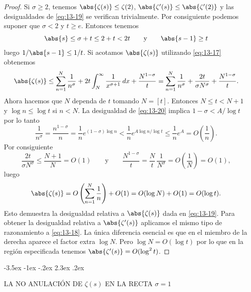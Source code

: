 \documentclass[12pt,a4paper]{book}
\makeatletter
\renewcommand\section{\@startsection{section}{1}{\z@}%
  {-3.5ex \@plus -1ex \@minus -.2ex}%
  {2.3ex \@plus .2ex}%
  {\normalfont\Large\bfseries\raggedright}}
\makeatother
\begin{document}
    \begin{proof}
        Si $\sigma\geq2$, tenemos $\abs{\zeta(s)}\leq\zeta(2)$, $\abs{\zeta'(s)}\leq\abs{\zeta'(2)}$
        y las desigualdades de \eqref{eq:13-19} se verifican trivialmente. Por consiguiente
        podemos suponer que $\sigma<2$ y $t\geq e$. Entonces tenemos
        \begin{equation*}
            \abs{s}\leq\sigma+t\leq2+t<2t\qquad\text{y}\qquad\abs{s-1}\geq t
        \end{equation*}
        luego $1/\abs{s-1}\leq1/t$. Si acotamos $\abs{\zeta(s)}$ utilizando \eqref{eq:13-17}
        obtenemos
        \begin{equation*}
            \abs{\zeta(s)}\leq\sum_{n=1}^{N}\frac{1}{n^{\sigma}}+2t\int_{N}^{\infty}\frac{1}{x^{\sigma+1}}\,dx+\frac{N^{1-\sigma}}{t}=\sum_{n=1}^{N}\frac{1}{n^{\sigma}}+\frac{2t}{\sigma N^{\sigma}}+\frac{N^{1-\sigma}}{t}.
        \end{equation*}
        Ahora hacemos que $N$ dependa de $t$ tomando $N=[t]$. Entonces $N\leq t<N+1$ y
        $\log n\leq\log t$ si $n<N$. La desigualdad de \eqref{eq:13-20} implica
        $1-\sigma<A/\log t$ por lo tanto
        \begin{equation*}
            \frac{1}{n^{\sigma}}=\frac{n^{1-\sigma}}{n}=\frac{1}{n}e^{(1-\sigma)\log n}<\frac{1}{n}e^{A\log n/\log t}\leq\frac{1}{n}e^{A}=O\left(\frac{1}{n}\right).
        \end{equation*}
        Por consiguiente
        \begin{equation*}
            \frac{2t}{\sigma N^{\sigma}}\leq\frac{N+1}{N}=O(1)\qquad\text{y}\qquad\frac{N^{1-\sigma}}{t}=\frac{N}{t}\,\frac{1}{N^{\sigma}}=O\left(\frac{1}{N}\right)=O(1),
        \end{equation*}
        luego
        \begin{equation*}
            \abs{\zeta(s)}=O\left(\sum_{n=1}^{N}\frac{1}{n}\right)+O(1)=O(\log N)+O(1)=O(\log t).
        \end{equation*}
        Esto demuestra la desigualdad relativa a $\abs{\zeta(s)}$ dada en \eqref{eq:13-19}. Para
        obtener la desigualdad relativa a $\abs{\zeta'(s)}$ aplicamos el mismo tipo de
        razonamiento a \eqref{eq:13-18}. La única diferencia esencial es que en el miembro de
        la derecha aparece el factor extra $\log N$. Pero $\log N=O(\log t)$ por lo que en la
        región especificada tenemos $\abs{\zeta'(s)}=O(\log^{2}t)$.
    \end{proof}

    \section{LA NO ANULACIÓN DE \texorpdfstring{$\zeta(s)$}{ζ(s)} EN LA RECTA \texorpdfstring{$\sigma=1$}{σ=1}}
\end{document}
